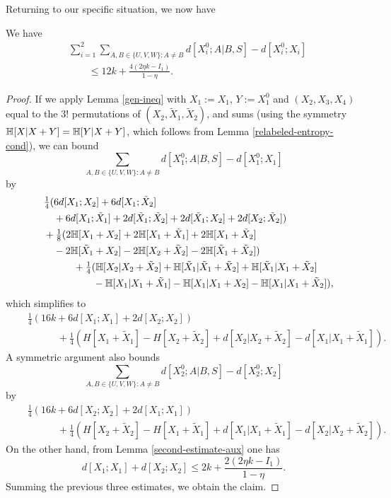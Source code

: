 Returning to our specific situation, we now have

\begin{lemma}\label{dist-diff-bound}\leanok We have
\begin{align*}  &\sum_{i=1}^2 \sum_{A,B \in \{U,V,W\}: A \neq B}  d[X_i^0;A|B, S] - d[X_i^0;X_i]\\
&\qquad \leq 12 k + \frac{4(2 \eta k - I_1)}{1-\eta}.
\end{align*}
\end{lemma}

\begin{proof}\leanok
If we apply Lemma \ref{gen-ineq} with $X_1:=X_1$, $Y:=X_1^0$ and $(X_2,X_3,X_4)$ equal to the $3!$ permutations of $(X_2,\tilde X_1,\tilde X_2)$, and sums (using the symmetry $\mathbb{H}[X|X+Y] = \mathbb{H}[Y|X+Y]$, which follows from Lemma \ref{relabeled-entropy-cond}), we can bound
$$ \sum_{A,B \in \{U,V,W\}: A \neq B}  d[X_1^0;A|B, S] - d[X_1^0;X_1]$$
by
\begin{align*}
  &\quad \tfrac{1}{4} (6d[X_1;X_2] + 6d[X_1;\tilde X_2]\\
  &\qquad + 6d[X_1;\tilde X_1] + 2d[\tilde X_1;\tilde X_2] + 2 d[\tilde X_1;X_2] + 2d[X_2;\tilde X_2])\\
  &\quad + \tfrac{1}{8} (2\mathbb{H}[X_1+X_2] + 2\mathbb{H}[X_1+\tilde X_1] + 2 \mathbb{H}[X_1+\tilde X_2] \\
  &\qquad - 2\mathbb{H}[\tilde X_1+X_2] - 2\mathbb{H}[X_2+\tilde X_2] - 2\mathbb{H}[\tilde X_1+\tilde X_2])\\
  &\qquad \qquad + \tfrac{1}{4} (\mathbb{H}[X_2|X_2+\tilde X_2] + \mathbb{H}[\tilde X_1|\tilde X_1+\tilde X_2] + \mathbb{H}[\tilde X_1|X_1+\tilde X_2] \\
  &\qquad \qquad \qquad - \mathbb{H}[X_1|X_1+\tilde X_1] - \mathbb{H}[X_1|X_1+X_2] - \mathbb{H}[X_1|X_1+\tilde X_2]),
\end{align*}
which simplifies to
\begin{align*}
  &\quad \tfrac{1}{4} (16k + 6d[X_1;X_1] + 2d[X_2;X_2])\\
  &\qquad \qquad + \tfrac{1}{4} (H[X_1+\tilde X_1] - H[X_2+\tilde X_2] + d[X_2|X_2+\tilde X_2] - d[X_1|X_1+\tilde X_1]).
\end{align*}
A symmetric argument also bounds
$$ \sum_{A,B \in \{U,V,W\}: A \neq B}  d[X_2^0;A|B, S] - d[X_2^0;X_2]$$
by
\begin{align*}
  &\quad \tfrac{1}{4} (16k + 6d[X_2;X_2] + 2d[X_1;X_1])\\
  &\qquad \qquad + \tfrac{1}{4} (H[X_2+\tilde X_2] - H[X_1+\tilde X_1] + d[X_1|X_1+\tilde X_1] - d[X_2|X_2+\tilde X_2]).
\end{align*}
On the other hand, from Lemma \ref{second-estimate-aux} one has
$$ d[X_1;X_1] + d[X_2;X_2] \leq 2 k + \frac{2(2 \eta k - I_1)}{1-\eta}.$$
Summing the previous three estimates, we obtain the claim.
\end{proof}

